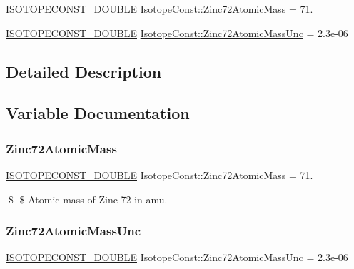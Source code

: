 \begin{DoxyCompactItemize}
\item 
\mbox{\hyperlink{group___isotope_const-_macros_ga8f45a7272ce02c0b4c65c44636ed719a}{I\+S\+O\+T\+O\+P\+E\+C\+O\+N\+S\+T\+\_\+\+D\+O\+U\+B\+LE}} \mbox{\hyperlink{group___isotope_const-_zinc-_zn72_gaa0ed8a0039c8b3329b0dbdc777d2626a}{Isotope\+Const\+::\+Zinc72\+Atomic\+Mass}} = 71.
\item 
\mbox{\hyperlink{group___isotope_const-_macros_ga8f45a7272ce02c0b4c65c44636ed719a}{I\+S\+O\+T\+O\+P\+E\+C\+O\+N\+S\+T\+\_\+\+D\+O\+U\+B\+LE}} \mbox{\hyperlink{group___isotope_const-_zinc-_zn72_ga8932a2eae91dcd95eb64a4b6d0c820e3}{Isotope\+Const\+::\+Zinc72\+Atomic\+Mass\+Unc}} = 2.\+3e-\/06
\end{DoxyCompactItemize}


\subsection{Detailed Description}


\subsection{Variable Documentation}
\mbox{\label{group___isotope_const-_zinc-_zn72_gaa0ed8a0039c8b3329b0dbdc777d2626a}} 
\subsubsection{\texorpdfstring{Zinc72\+Atomic\+Mass}{Zinc72AtomicMass}}
{\footnotesize\ttfamily \mbox{\hyperlink{group___isotope_const-_macros_ga8f45a7272ce02c0b4c65c44636ed719a}{I\+S\+O\+T\+O\+P\+E\+C\+O\+N\+S\+T\+\_\+\+D\+O\+U\+B\+LE}} Isotope\+Const\+::\+Zinc72\+Atomic\+Mass = 71.}

\$ \$ Atomic mass of Zinc-\/72 in amu. \mbox{\label{group___isotope_const-_zinc-_zn72_ga8932a2eae91dcd95eb64a4b6d0c820e3}} 
\subsubsection{\texorpdfstring{Zinc72\+Atomic\+Mass\+Unc}{Zinc72AtomicMassUnc}}
{\footnotesize\ttfamily \mbox{\hyperlink{group___isotope_const-_macros_ga8f45a7272ce02c0b4c65c44636ed719a}{I\+S\+O\+T\+O\+P\+E\+C\+O\+N\+S\+T\+\_\+\+D\+O\+U\+B\+LE}} Isotope\+Const\+::\+Zinc72\+Atomic\+Mass\+Unc = 2.\+3e-\/06}

